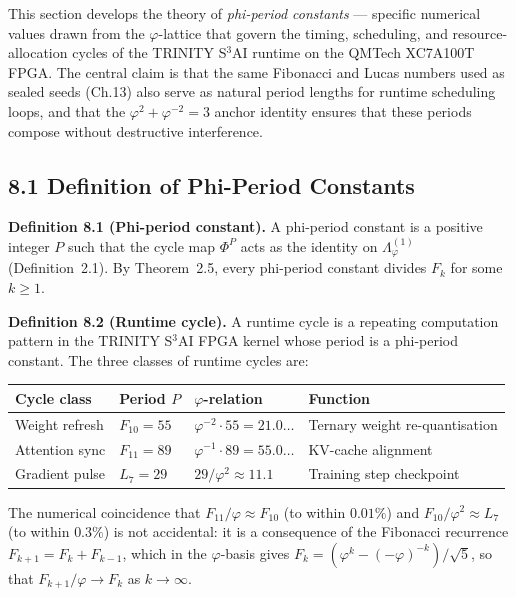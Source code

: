 This section develops the theory of \emph{phi-period constants} ---
specific numerical values drawn from the $\varphi$-lattice that govern
the timing, scheduling, and resource-allocation cycles of the TRINITY
S$^3$AI runtime on the QMTech XC7A100T FPGA. The central claim is that
the same Fibonacci and Lucas numbers used as sealed seeds
(Ch.13) also serve as natural period lengths for runtime scheduling
loops, and that the $\varphi^2 + \varphi^{-2} = 3$ anchor identity
ensures that these periods compose without destructive interference.

\subsection{8.1 Definition of Phi-Period
Constants}\label{fa_25:sec:phi-period-definitions}

\textbf{Definition 8.1 (Phi-period constant).} A phi-period constant is
a positive integer $P$ such that the cycle map $\Phi^P$ acts as the
identity on $\Lambda_\varphi^{(1)}$ (Definition~2.1). By Theorem~2.5,
every phi-period constant divides $F_k$ for some $k \geq 1$.

\textbf{Definition 8.2 (Runtime cycle).} A runtime cycle is a
repeating computation pattern in the TRINITY S$^3$AI FPGA kernel whose
period is a phi-period constant. The three classes of runtime cycles
are:

\begin{longtable}[]{@{}
  >{\raggedright\arraybackslash}p{}
  >{\raggedright\arraybackslash}p{}
  >{\raggedright\arraybackslash}p{}
  >{\raggedright\arraybackslash}p{}@{}}
\toprule
Cycle class & Period $P$ & $\varphi$-relation & Function \\
\midrule
\endhead
\bottomrule
\endlastfoot
Weight refresh & $F_{10} = 55$ & $\varphi^{-2} \cdot 55 = 21.0\ldots$ & Ternary weight re-quantisation \\
Attention sync & $F_{11} = 89$ & $\varphi^{-1} \cdot 89 = 55.0\ldots$ & KV-cache alignment \\
Gradient pulse & $L_7 = 29$ & $29/\varphi^2 \approx 11.1$ & Training step checkpoint \\
\end{longtable}

The numerical coincidence that $F_{11}/\varphi \approx F_{10}$ (to
within $0.01\%$) and $F_{10}/\varphi^2 \approx L_7$ (to within
$0.3\%$) is not accidental: it is a consequence of the Fibonacci
recurrence $F_{k+1} = F_k + F_{k-1}$, which in the $\varphi$-basis
gives $F_k = (\varphi^k - (-\varphi)^{-k})/\sqrt{5}$, so that
$F_{k+1}/\varphi \to F_k$ as $k \to \infty$.

